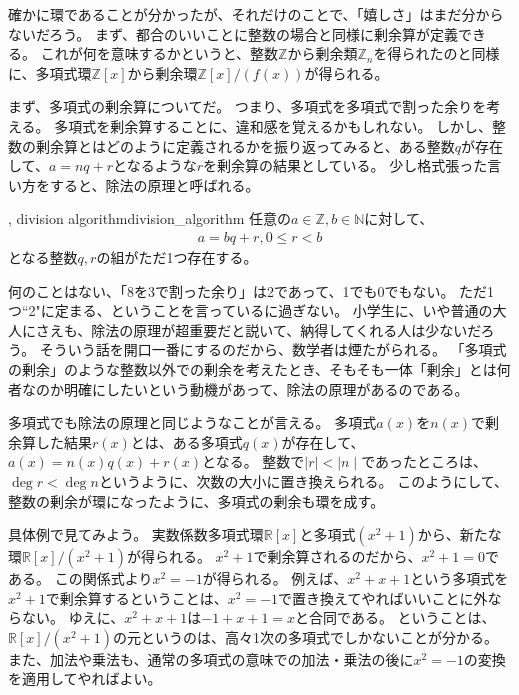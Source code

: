 確かに環であることが分かったが、それだけのことで、「嬉しさ」はまだ分からないだろう。
まず、都合のいいことに整数の場合と同様に剰余算が定義できる。
これが何を意味するかというと、整数$\mathbb{Z}$から剰余類$\mathbb{Z}_n$を得られたのと同様に、多項式環$\mathbb{Z}[x]$から剰余環$\mathbb{Z}[x]/(f(x))$が得られる。

まず、多項式の剰余算についてだ。
つまり、多項式を多項式で割った余りを考える。
多項式を剰余算することに、違和感を覚えるかもしれない。
しかし、整数の剰余算とはどのように定義されるかを振り返ってみると、ある整数$q$が存在して、$a = nq + r$となるような$r$を剰余算の結果としている。
少し格式張った言い方をすると、除法の原理と呼ばれる。

\begin{Theo}{, division algorithm}{division_algorithm}
任意の$a\in\mathbb{Z},b\in\mathbb{N}$に対して、
\begin{align*}
a = bq + r, 0 \le r < b
\end{align*}
となる整数$q,r$の組がただ1つ存在する。
\end{Theo}

何のことはない、「8を3で割った余り」は2であって、1でも0でもない。
ただ1つ``2"に定まる、ということを言っているに過ぎない。
小学生に、いや普通の大人にさえも、除法の原理が超重要だと説いて、納得してくれる人は少ないだろう。
そういう話を開口一番にするのだから、数学者は煙たがられる。
「多項式の剰余」のような整数以外での剰余を考えたとき、そもそも一体「剰余」とは何者なのか明確にしたいという動機があって、除法の原理があるのである。

多項式でも除法の原理と同じようなことが言える。
多項式$a(x)$を$n(x)$で剰余算した結果$r(x)$とは、ある多項式$q(x)$が存在して、$a(x) = n(x)q(x) + r(x)$となる。
整数で$\mid r\mid < \mid n \mid$であったところは、$\deg r < \deg n$というように、次数の大小に置き換えられる。
このようにして、整数の剰余が環になったように、多項式の剰余も環を成す。

具体例で見てみよう。
実数係数多項式環$\mathbb{R}[x]$と多項式$(x^2+1)$から、新たな環$\mathbb{R}[x]/(x^2+1)$が得られる。
$x^2+1$で剰余算されるのだから、$x^2+1=0$である。
この関係式より$x^2=-1$が得られる。
例えば、$x^2+x+1$という多項式を$x^2+1$で剰余算するということは、$x^2=-1$で置き換えてやればいいことに外ならない。
ゆえに、$x^2+x+1$は$-1+x+1=x$と合同である。
ということは、$\mathbb{R}[x]/(x^2+1)$の元というのは、高々1次の多項式でしかないことが分かる。
また、加法や乗法も、通常の多項式の意味での加法・乗法の後に$x^2=-1$の変換を適用してやればよい。

